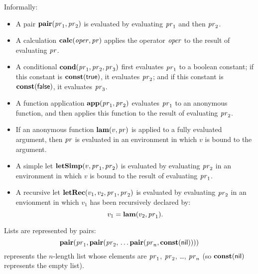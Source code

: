 Informally:
\begin{itemize}
\item A pair $\mathbf{pair}(\mathit{pr}_1,\mathit{pr}_2)$ is evaluated by evaluating
  $\mathit{pr}_1$ and then $\mathit{pr}_2$.

\item A calculation $\mathbf{calc}(\mathit{oper},\mathit{pr})$ applies the operator
  $\mathit{oper}$ to the result of evaluating $\mathit{pr}$.

\item A conditional $\mathbf{cond}(\mathit{pr}_1,\mathit{pr}_2,\mathit{pr}_3)$ first evaluates
  $\mathit{pr}_1$ to a boolean constant; if this constant is
  $\mathbf{const}(\mathsf{true})$, it evaluates $\mathit{pr}_2$; and if this constant
  is $\mathbf{const}(\mathsf{false})$, it evaluates $\mathit{pr}_3$.

\item A function application $\mathbf{app}(\mathit{pr}_1, \mathit{pr}_2)$ evaluates
  $\mathit{pr}_1$ to an anonymous function, and then applies this function
  to the result of evaluating $\mathit{pr}_2$.

\item If an anonymous function $\mathbf{lam}(v,\mathit{pr})$ is applied to a fully
  evaluated argument, then $\mathit{pr}$ is evaluated in an environment in
  which $v$ is bound to the argument.

\item A simple let $\mathbf{letSimp}(v, \mathit{pr}_1, \mathit{pr}_2)$ is evaluated by
  evaluating $\mathit{pr}_2$ in an environment in which $v$ is bound to the
  result of evaluating $\mathit{pr}_1$.

\item A recursive let $\mathbf{letRec}(v_1,v_2,\mathit{pr}_1,\mathit{pr}_2)$ is evaluated
  by evaluating $\mathit{pr}_2$ in an envionment in which $v_1$ has been
  recursively declared by:
  \begin{displaymath}
    v_1 = \mathbf{lam}(v_2, \mathit{pr}_1) .
  \end{displaymath}
\end{itemize}

Lists are represented by pairs:
\begin{displaymath}
  \mathbf{pair}(\mathit{pr}_1,\mathbf{pair}(\mathit{pr}_2,\,\ldots \mathbf{pair}(\mathit{pr}_n,
  \mathbf{const}(\mathsf{nil}))))
\end{displaymath}
represents the $n$-length list whose elements are $\mathit{pr}_1$, $\mathit{pr}_2$, \ldots,
$\mathit{pr}_n$ (so $\mathbf{const}(\mathsf{nil})$ represents the empty list).

